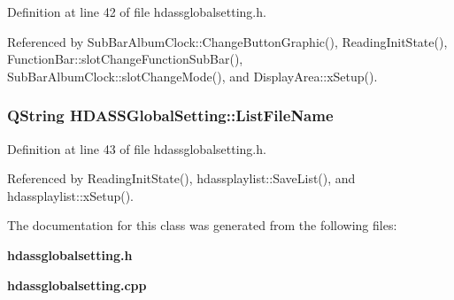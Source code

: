 Definition at line 42 of file hdassglobalsetting.h.

Referenced by Sub\-Bar\-Album\-Clock::Change\-Button\-Graphic(), Reading\-Init\-State(), Function\-Bar::slot\-Change\-Function\-Sub\-Bar(), Sub\-Bar\-Album\-Clock::slot\-Change\-Mode(), and Display\-Area::x\-Setup().
\subsubsection{\setlength{\rightskip}{0pt plus 5cm}QString {\bf HDASSGlobal\-Setting::List\-File\-Name}}\label{classHDASSGlobalSetting_HDASSGlobalSettingo3}




Definition at line 43 of file hdassglobalsetting.h.

Referenced by Reading\-Init\-State(), hdassplaylist::Save\-List(), and hdassplaylist::x\-Setup().

The documentation for this class was generated from the following files:\begin{CompactItemize}
\item 
{\bf hdassglobalsetting.h}\item 
{\bf hdassglobalsetting.cpp}\end{CompactItemize}

